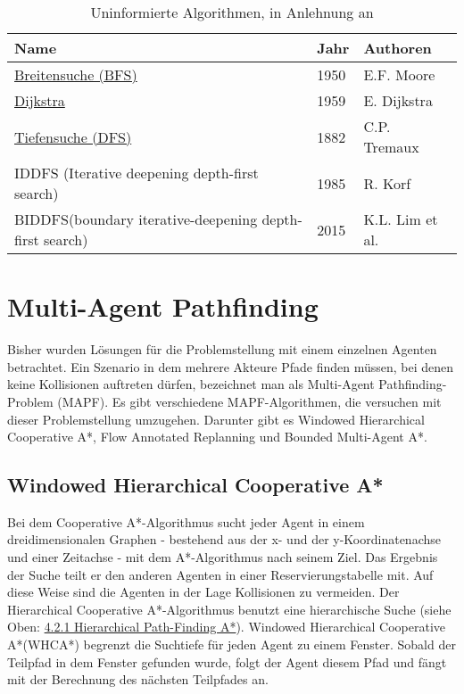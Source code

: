 \begin{table}[h]
	\begin{tabular}[h]{L{8cm}|C{1cm}|L{5cm}}
		\hline
		\textbf{Name}                                                    & \textbf{Jahr} & \textbf{Authoren}        \\ \hline
		\hyperref[sec:bfs]{Breitensuche (BFS)}                                      & 1950 & E.F. Moore      \\ \hline
		\hyperref[sec:dijkstra]{Dijkstra}                                                & 1959 & E. Dijkstra     \\ \hline
		\hyperref[sec:dfs]{Tiefensuche (DFS)}                                       & 1882 & C.P. Tremaux    \\ \hline
		IDDFS (Iterative deepening depth-first search)          & 1985 & R. Korf         \\ \hline
		BIDDFS(boundary iterative-deepening depth-first search) & 2015 & K.L. Lim et al. \\ \hline
	\end{tabular}
	\caption{\label{tab:uninformed}Uninformierte Algorithmen, in Anlehnung an \cite[S.233]{Noo15}}
\end{table}



\section{Multi-Agent Pathfinding}
Bisher wurden Lösungen für die Problemstellung mit einem einzelnen Agenten betrachtet. Ein Szenario in dem mehrere Akteure Pfade finden müssen, bei denen keine Kollisionen auftreten dürfen, bezeichnet man als Multi-Agent Pathfinding-Problem (MAPF). Es gibt verschiedene MAPF-Algorithmen, die versuchen mit dieser Problemstellung umzugehen. Darunter gibt es Windowed Hierarchical Cooperative A*, Flow Annotated Replanning und Bounded Multi-Agent A*.

\subsection{Windowed Hierarchical Cooperative A*}
Bei dem Cooperative A*-Algorithmus sucht jeder Agent in einem dreidimensionalen Graphen - bestehend aus der x- und der y-Koordinatenachse und einer Zeitachse - mit dem A*-Algorithmus nach seinem Ziel. 
Das Ergebnis der Suche teilt er den anderen Agenten in einer Reservierungstabelle mit. Auf diese Weise sind die Agenten in der Lage Kollisionen zu vermeiden. 
Der Hierarchical Cooperative A*-Algorithmus benutzt eine hierarchische Suche (siehe Oben: \hyperref[sec:hpa]{4.2.1 Hierarchical Path-Finding A*}). Windowed Hierarchical Cooperative A*(WHCA*) begrenzt die Suchtiefe für jeden Agent zu einem Fenster. Sobald der Teilpfad in dem Fenster gefunden wurde, folgt der Agent diesem Pfad und fängt mit der Berechnung des nächsten Teilpfades an.
